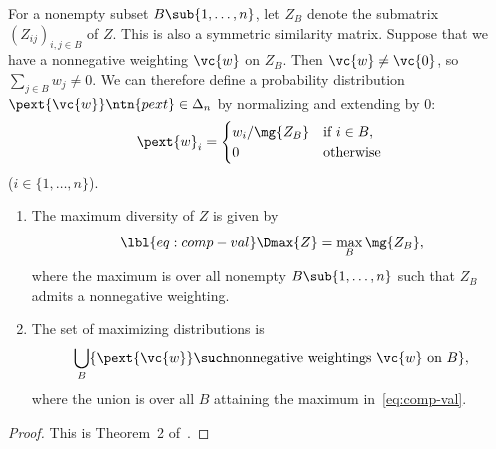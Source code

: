 For a nonempty subset $B \sub \{1, \ldots, n\}$, let $Z_B$ denote
the submatrix $(Z_{ij})_{i, j \in B}$ of $Z$.  This is also a symmetric
similarity matrix.  Suppose that we have a nonnegative weighting $\vc{w}$
on $Z_B$.  Then $\vc{w} \neq \vc{0}$, so $\sum_{j \in B} w_j \neq 0$.  We
can therefore define a probability distribution $\pext{\vc{w}}\ntn{pext} \in
\Delta_n$ by normalizing and extending by $0$:
\[
\pext{w}_i
=
\begin{cases}
w_i/\mg{Z_B}      &\text{if } i \in B,    \\
0               &\text{otherwise}
\end{cases}
\]
($i \in \{1, \ldots, n\}$).  

\begin{thm}
%
%
%
% 
\begin{enumerate}
\item 
{}
The maximum diversity of $Z$ is given by
% 
\begin{equation}
\lbl{eq:comp-val}
\Dmax{Z}
=
\max_B \mg{Z_B},
\end{equation}
% 
where the maximum is over all nonempty $B \sub \{1, \ldots, n\}$ such that
$Z_B$ admits a nonnegative weighting.

\item
{}
The set of maximizing distributions is
\[
\bigcup_B \{ 
\pext{\vc{w}} \such
\text{nonnegative weightings } \vc{w} \text{ on } B
\},
\]
where the union is over all $B$ attaining the maximum
in~\eqref{eq:comp-val}. 
\end{enumerate}
\end{thm}

\begin{proof}
This is Theorem~2 of~\cite{MDBB}.
\end{proof}

